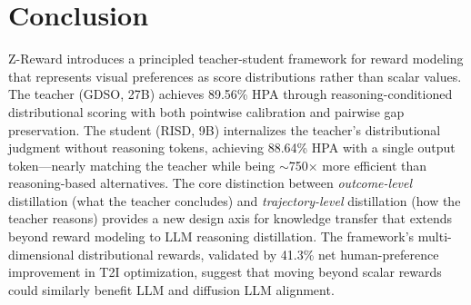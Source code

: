 \documentclass[11pt,a4paper]{article}
\begin{document}
\section{Conclusion}

Z-Reward introduces a principled teacher-student framework for reward modeling that represents visual preferences as score distributions rather than scalar values. The teacher (GDSO, 27B) achieves 89.56\% HPA through reasoning-conditioned distributional scoring with both pointwise calibration and pairwise gap preservation. The student (RISD, 9B) internalizes the teacher's distributional judgment without reasoning tokens, achieving 88.64\% HPA with a single output token---nearly matching the teacher while being $\sim$750$\times$ more efficient than reasoning-based alternatives. The core distinction between \emph{outcome-level} distillation (what the teacher concludes) and \emph{trajectory-level} distillation (how the teacher reasons) provides a new design axis for knowledge transfer that extends beyond reward modeling to LLM reasoning distillation. The framework's multi-dimensional distributional rewards, validated by 41.3\% net human-preference improvement in T2I optimization, suggest that moving beyond scalar rewards could similarly benefit LLM and diffusion LLM alignment.
\end{document}
